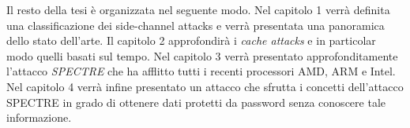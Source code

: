 	 Il resto della tesi è organizzata nel seguente modo. Nel capitolo 1 verrà definita una classificazione dei side-channel attacks e verrà presentata una panoramica dello stato dell'arte. Il capitolo 2 approfondirà i \emph{cache attacks} e in particolar modo quelli basati sul tempo.
	 Nel capitolo 3 verrà presentato approfonditamente l'attacco \emph{SPECTRE} che ha afflitto tutti i recenti processori AMD, ARM e Intel.
	 Nel capitolo 4 verrà infine presentato un attacco che sfrutta i concetti dell'attacco SPECTRE in grado di ottenere dati protetti da password senza conoscere tale informazione.
